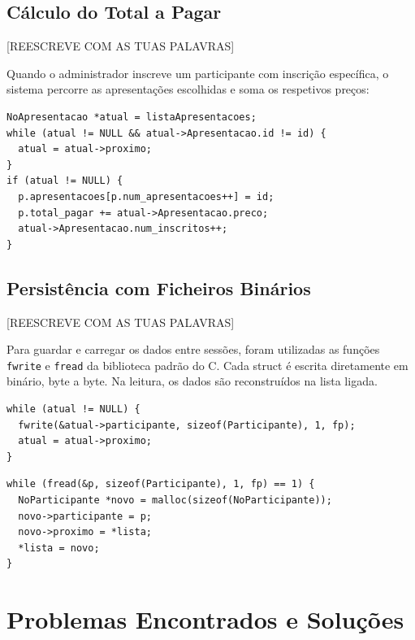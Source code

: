 \documentclass[12pt,a4paper]{article}
\begin{document}
\subsection{Cálculo do Total a Pagar}

[REESCREVE COM AS TUAS PALAVRAS]

Quando o administrador inscreve um participante com inscrição específica, o sistema percorre as apresentações escolhidas e soma os respetivos preços:

\begin{lstlisting}[style=cstyle, caption={Cálculo do total na inscrição específica}]
NoApresentacao *atual = listaApresentacoes;
while (atual != NULL && atual->Apresentacao.id != id) {
  atual = atual->proximo;
}
if (atual != NULL) {
  p.apresentacoes[p.num_apresentacoes++] = id;
  p.total_pagar += atual->Apresentacao.preco;
  atual->Apresentacao.num_inscritos++;
}
\end{lstlisting}

\subsection{Persistência com Ficheiros Binários}

[REESCREVE COM AS TUAS PALAVRAS]

Para guardar e carregar os dados entre sessões, foram utilizadas as funções \texttt{fwrite} e \texttt{fread} da biblioteca padrão do C. Cada struct é escrita diretamente em binário, byte a byte. Na leitura, os dados são reconstruídos na lista ligada.

\begin{lstlisting}[style=cstyle, caption={Guardar participantes em ficheiro binário}]
while (atual != NULL) {
  fwrite(&atual->participante, sizeof(Participante), 1, fp);
  atual = atual->proximo;
}
\end{lstlisting}

\begin{lstlisting}[style=cstyle, caption={Carregar participantes do ficheiro}]
while (fread(&p, sizeof(Participante), 1, fp) == 1) {
  NoParticipante *novo = malloc(sizeof(NoParticipante));
  novo->participante = p;
  novo->proximo = *lista;
  *lista = novo;
}
\end{lstlisting}

\section{Problemas Encontrados e Soluções}
\end{document}
